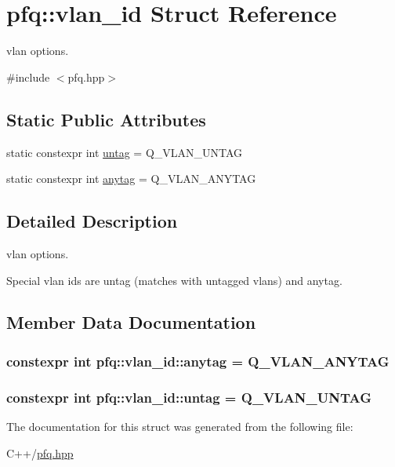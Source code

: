 \hypertarget{structpfq_1_1vlan__id}{\section{pfq\+:\+:vlan\+\_\+id Struct Reference}
\label{structpfq_1_1vlan__id}
}


vlan options.  




{\ttfamily \#include $<$pfq.\+hpp$>$}

\subsection*{Static Public Attributes}
\begin{DoxyCompactItemize}
\item 
static constexpr int \hyperlink{structpfq_1_1vlan__id_a9e30bbd86d62e58ae5e5e080f7e046df}{untag} = Q\+\_\+\+V\+L\+A\+N\+\_\+\+U\+N\+T\+A\+G
\item 
static constexpr int \hyperlink{structpfq_1_1vlan__id_affdae3b855070274e64b5d5696d6d72e}{anytag} = Q\+\_\+\+V\+L\+A\+N\+\_\+\+A\+N\+Y\+T\+A\+G
\end{DoxyCompactItemize}


\subsection{Detailed Description}
vlan options. 

Special vlan ids are untag (matches with untagged vlans) and anytag. 

\subsection{Member Data Documentation}
\hypertarget{structpfq_1_1vlan__id_affdae3b855070274e64b5d5696d6d72e}{
\subsubsection[{anytag}]{\setlength{\rightskip}{0pt plus 5cm}constexpr int pfq\+::vlan\+\_\+id\+::anytag = Q\+\_\+\+V\+L\+A\+N\+\_\+\+A\+N\+Y\+T\+A\+G\hspace{0.3cm}{\ttfamily [static]}}}\label{structpfq_1_1vlan__id_affdae3b855070274e64b5d5696d6d72e}
\hypertarget{structpfq_1_1vlan__id_a9e30bbd86d62e58ae5e5e080f7e046df}{
\subsubsection[{untag}]{\setlength{\rightskip}{0pt plus 5cm}constexpr int pfq\+::vlan\+\_\+id\+::untag = Q\+\_\+\+V\+L\+A\+N\+\_\+\+U\+N\+T\+A\+G\hspace{0.3cm}{\ttfamily [static]}}}\label{structpfq_1_1vlan__id_a9e30bbd86d62e58ae5e5e080f7e046df}


The documentation for this struct was generated from the following file\+:\begin{DoxyCompactItemize}
\item 
C++/\hyperlink{pfq_8hpp}{pfq.\+hpp}\end{DoxyCompactItemize}
